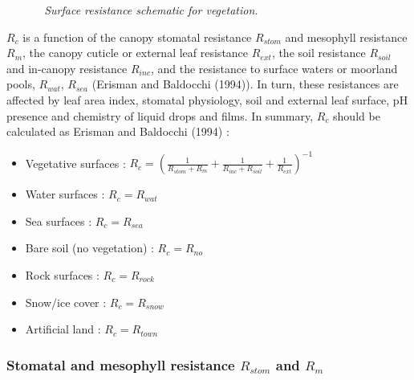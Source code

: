 \begin{figure}[htb]
\centerline{}
\caption{\sl ~{Surface resistance schematic for vegetation.}}
\label{schema2}
\end{figure}
$R_c$ is a function of the canopy stomatal resistance $R_{stom}$ and mesophyll
resistance $R_m$, the canopy cuticle or external leaf resistance $R_{ext}$, the
soil resistance $R_{soil}$ and in-canopy resistance $R_{inc}$, 
and the resistance
to surface waters or moorland pools, $R_{wat}$, $R_{sea}$ (Erisman and Baldocchi (1994)\nocite{Erisman1994}).
In turn, these resistances are affected by leaf area index, stomatal
physiology, soil and external leaf surface, pH presence and chemistry of
liquid drops and films.
In summary, $R_c$ should be calculated as Erisman and Baldocchi (1994) :
\begin{itemize}
\item Vegetative surfaces :
$
R_c= \left(\frac{1}{R_{stom}+R_m}+\frac{1}{R_{inc}+R_{soil}} + \frac{1}{R_{ext}} \right)^{-1} 
$
\item Water surfaces : $R_c=R_{wat}$
\item Sea surfaces : $R_c=R_{sea}$ 
\item Bare soil (no vegetation) : $R_c=R_{no}$
\item Rock surfaces : $R_c=R_{rock}$
\item Snow/ice  cover : $R_c=R_{snow}$
\item Artificial land : $R_c=R_{town}$

\end{itemize}
\subsubsection*{Stomatal and mesophyll resistance $R_{stom}$ and $R_m$}

